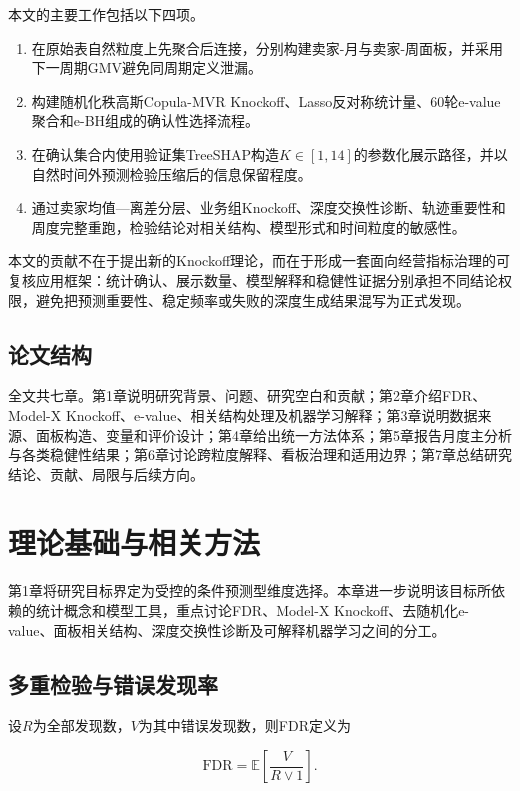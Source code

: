 \documentclass{sufethesismas}
\providecommand{\tightlist}{\setlength{\itemsep}{0pt}\setlength{\parskip}{0pt}}
\begin{document}
本文的主要工作包括以下四项。

\begin{enumerate}
\def\labelenumi{\arabic{enumi}.}
\tightlist
\item
  在原始表自然粒度上先聚合后连接，分别构建卖家-月与卖家-周面板，并采用下一周期GMV避免同周期定义泄漏。
\item
  构建随机化秩高斯Copula-MVR Knockoff、Lasso反对称统计量、60轮e-value聚合和e-BH组成的确认性选择流程。
\item
  在确认集合内使用验证集TreeSHAP构造\(K\in[1,14]\)的参数化展示路径，并以自然时间外预测检验压缩后的信息保留程度。
\item
  通过卖家均值---离差分层、业务组Knockoff、深度交换性诊断、轨迹重要性和周度完整重跑，检验结论对相关结构、模型形式和时间粒度的敏感性。
\end{enumerate}

本文的贡献不在于提出新的Knockoff理论，而在于形成一套面向经营指标治理的可复核应用框架：统计确认、展示数量、模型解释和稳健性证据分别承担不同结论权限，避免把预测重要性、稳定频率或失败的深度生成结果混写为正式发现。

\section{论文结构}

全文共七章。第1章说明研究背景、问题、研究空白和贡献；第2章介绍FDR、Model-X Knockoff、e-value、相关结构处理及机器学习解释；第3章说明数据来源、面板构造、变量和评价设计；第4章给出统一方法体系；第5章报告月度主分析与各类稳健性结果；第6章讨论跨粒度解释、看板治理和适用边界；第7章总结研究结论、贡献、局限与后续方向。

\chapter{理论基础与相关方法}

第1章将研究目标界定为受控的条件预测型维度选择。本章进一步说明该目标所依赖的统计概念和模型工具，重点讨论FDR、Model-X Knockoff、去随机化e-value、面板相关结构、深度交换性诊断及可解释机器学习之间的分工。

\section{多重检验与错误发现率}

设\(R\)为全部发现数，\(V\)为其中错误发现数，则FDR定义为

\[
\mathrm{FDR}=\mathbb{E}\left[\frac{V}{R\vee1}\right].
\]
\end{document}
